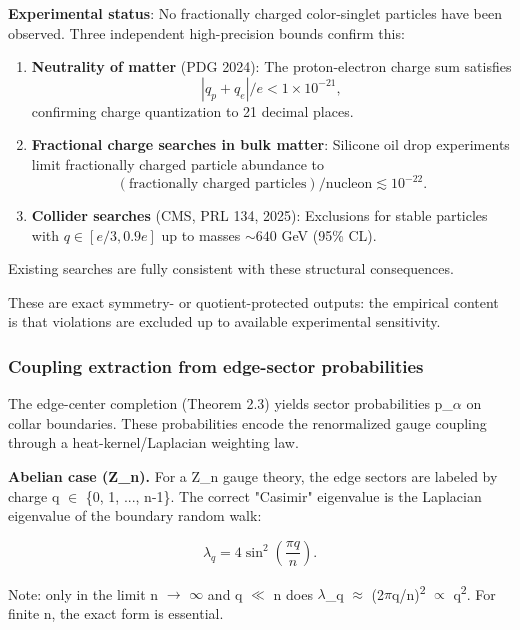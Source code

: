 \textbf{Experimental status}: No fractionally charged color-singlet particles have been observed. Three independent high-precision bounds confirm this:

\begin{enumerate}
\def\labelenumi{\arabic{enumi}.}
\item
  \textbf{Neutrality of matter} (PDG 2024): The proton-electron charge sum satisfies \[|q_p + q_e|/e < 1 \times 10^{-21},\] confirming charge quantization to 21 decimal places.
\item
  \textbf{Fractional charge searches in bulk matter}: Silicone oil drop experiments limit fractionally charged particle abundance to \[(\text{fractionally charged particles})/\text{nucleon} \lesssim 10^{-22}.\]
\item
  \textbf{Collider searches} (CMS, PRL 134, 2025): Exclusions for stable particles with \(q \in [e/3, 0.9e]\) up to masses \(\sim 640\) GeV (95\% CL).
\end{enumerate}

Existing searches are fully consistent with these structural consequences.

These are exact symmetry- or quotient-protected outputs: the empirical content is that violations are excluded up to available experimental sensitivity.

\subsubsection{Coupling extraction from edge-sector probabilities}\label{613-coupling-extraction-from-edge-sector-probabilities}

The edge-center completion (Theorem 2.3) yields sector probabilities p\_\ensuremath{\alpha} on collar boundaries. These probabilities encode the renormalized gauge coupling through a heat-kernel/Laplacian weighting law.

\textbf{Abelian case (Z\_n).} For a Z\_n gauge theory, the edge sectors are labeled by charge q \ensuremath{\in} \{0, 1, ..., n-1\}. The correct "Casimir" eigenvalue is the Laplacian eigenvalue of the boundary random walk:

\[
\lambda_q = 4 \sin^2\left(\frac{\pi q}{n}\right).
\]

Note: only in the limit n \ensuremath{\to} \ensuremath{\infty} and q \ensuremath{\ll} n does \ensuremath{\lambda}\_q \ensuremath{\approx} (2\ensuremath{\pi}q/n)\textsuperscript{2} \ensuremath{\propto} q\textsuperscript{2}. For finite n, the exact form is essential.

